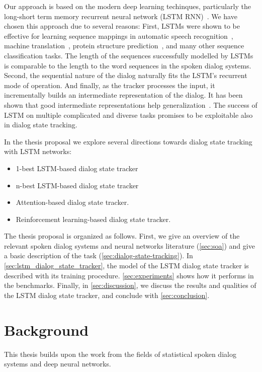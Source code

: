 \documentclass[11pt,twocolumn]{article}
\begin{document}
Our approach is based on the modern deep learning techinques, particularly the long-short term memory recurrent neural network (LSTM RNN)~\cite{hochreiter1997long}.
We have chosen this approach due to several reasons:
First, LSTMs were shown to be effective for learning sequence mappings in automatic speech recognition~\cite{graves2005framewise}, machine translation~\cite{sutskever2014sequence}, protein structure prediction~\cite{sonderby2014protein}, and many other sequence classification tasks. The length of the sequences successfully modelled by LSTMs is comparable to the length to the word sequences in the spoken dialog systems.
Second, the sequential nature of the dialog naturally fits the LSTM's recurrent mode of operation. And finally, as the tracker processes the input, it incrementally builds an intermediate representation of the dialog. It has been shown that good intermediate representations help generalization~\cite{gulccehre2013knowledge}.
The success of LSTM on multiple complicated and diverse tasks promises to be exploitable also in dialog state tracking.

In the thesis proposal we explore several directions towards dialog state tracking with LSTM networks:
\begin{itemize}
  \item 1-best LSTM-based dialog state tracker
  \item n-best LSTM-based dialog state tracker
  \item Attention-based dialog state tracker.
  \item Reinforcement learning-based dialog state tracker.
\end{itemize}

The thesis proposal is organized as follows. First, we give an overview of the relevant spoken dialog systems and neural networks literature (\autoref{sec:soa}) and give a basic description of the task (\autoref{sec:dialog-state-tracking}). In \autoref{sec:lstm_dialog_state_tracker}, the model of the LSTM dialog state tracker is described with its training procedure. \autoref{sec:experiments} shows how it performs in the benchmarks. Finally, in \autoref{sec:discussion}, we discuss the results and qualities of the LSTM dialog state tracker, and conclude with \autoref{sec:conclusion}.


\section{Background}
This thesis builds upon the work from the fields of statistical spoken dialog systems and deep neural networks.
\end{document}
